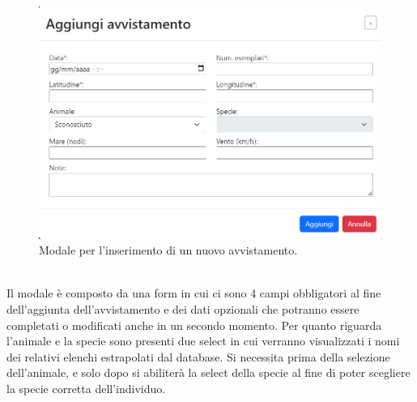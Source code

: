 \documentclass[a4paper,final,12pt]{report}
\begin{document}
\begin{figure}[hbtp]
\centering
\includegraphics[scale=0.50]{img_concettuale/aggiungiAvv.png}
\caption{Modale per l'inserimento di un nuovo avvistamento.}
\end{figure}
\\ Il modale è composto da una form in cui ci sono 4 campi obbligatori al fine dell'aggiunta dell'avvistamento e dei dati opzionali che potranno essere completati o modificati anche in un secondo momento. Per quanto riguarda l'animale e la specie sono presenti due select in cui verranno visualizzati i nomi dei relativi elenchi estrapolati dal database. Si necessita prima della selezione dell'animale, e solo dopo si abiliterà la select della specie al fine di poter scegliere la specie corretta dell'individuo.

\newpage
\end{document}
